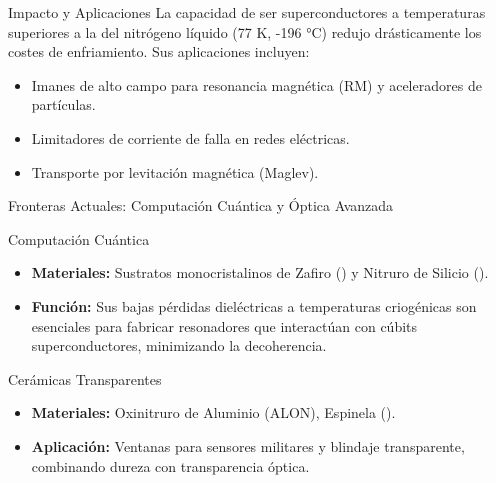 \begin{frame}
  \begin{block}{Impacto y Aplicaciones}
    La capacidad de ser superconductores a temperaturas superiores a la del
    nitrógeno líquido (77 K, -196 °C) redujo drásticamente los costes de
    enfriamiento. Sus aplicaciones incluyen:
    \begin{itemize}[<+->]
        \item Imanes de alto campo para resonancia magnética (RM) y
          aceleradores de partículas.
        \item Limitadores de corriente de falla en redes eléctricas.
        \item Transporte por levitación magnética (Maglev).
     \end{itemize}
  \end{block}
\end{frame}

\begin{frame}{Fronteras Actuales: Computación Cuántica y Óptica Avanzada}
  \begin{block}{Computación Cuántica}
    \begin{itemize}[<+->]
      \item \textbf{Materiales:} Sustratos monocristalinos de Zafiro ()
        y Nitruro de Silicio ().
      \item \textbf{Función:} Sus bajas pérdidas dieléctricas a temperaturas
        criogénicas son esenciales para fabricar resonadores que interactúan
        con cúbits superconductores, minimizando la decoherencia.
    \end{itemize}
  \end{block}

  \begin{block}{Cerámicas Transparentes}
    \begin{itemize}[<+->]
      \item \textbf{Materiales:} Oxinitruro de Aluminio (ALON), Espinela
        ().
      \item \textbf{Aplicación:} Ventanas para sensores militares y blindaje
        transparente, combinando dureza con transparencia óptica.
    \end{itemize}
  \end{block}
\end{frame}
